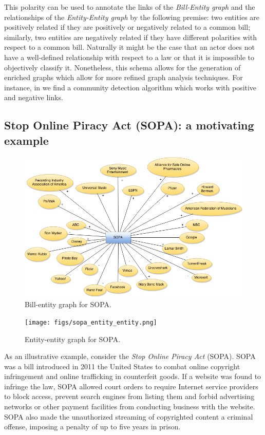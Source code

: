 This polarity can be used to annotate the links of the \emph{Bill-Entity graph} and the relationships of the \emph{Entity-Entity graph} by the following premise: two entities are positively related if they are positively or negatively related to a common bill; similarly, two entities are negatively related if they have different polarities with respect to a common bill. Naturally it might be the case that an actor does not have a well-defined relationship with respect to a law or that it is impossible to objectively classify it. Nonetheless, this schema allows for the generation of enriched graphs which allow for more refined graph analysis techniques. For instance, in \cite{traag2009community} we find a community detection algorithm which works with positive and negative links. 

\subsection{Stop Online Piracy Act (SOPA): a motivating example}\label{subsec:objectives}

\begin{figure}[h!]
    \centering
    \includegraphics[width=1\textwidth]{figs/sopa_bill_entity.png}
    \caption{Bill-entity graph for SOPA.}
    \label{fig:example_bill_entity}
\end{figure}

\begin{figure}[h!]
    \centering
    \texttt{[image: figs/sopa\_entity\_entity.png]}
    \caption{Entity-entity graph for SOPA.}
    \label{fig:example_entity_entity}
\end{figure}

As an illustrative  example, consider the \emph{Stop Online Piracy Act} (SOPA). SOPA was a bill introduced in 2011 the United States to combat online copyright infringement and online trafficking in counterfeit goods. If a website was found to infringe the law, SOPA allowed court orders to require Internet service providers to block access, prevent search engines from listing them and forbid advertising networks or other payment facilities from conducting business with the website. SOPA also made the unauthorized streaming of copyrighted content a criminal offense, imposing a penalty of up to five years in prison. \\ 

